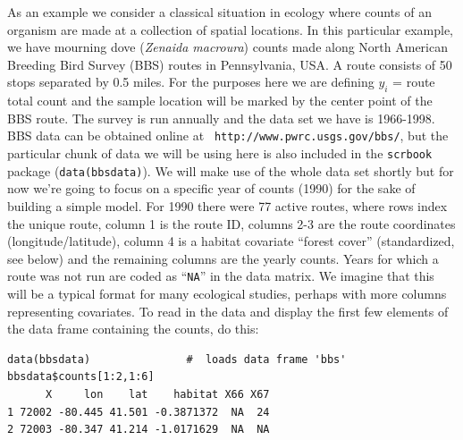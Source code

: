 As an example we consider a classical situation in ecology where
counts of an organism are made at a collection of spatial
locations. In this particular example, we have mourning dove 
({\it Zenaida macroura})
counts
made along North American Breeding Bird Survey (BBS) routes in
Pennsylvania, USA. A route consists of 50 stops separated by 0.5
miles. For the purposes here we are defining $y_i$ = route total count
and the sample location will be marked by the center point of the BBS
route.  The survey is run annually and the data set we have is
1966-1998. BBS data can be obtained online at \mbox{\tt
  http:\//\//www.pwrc.usgs.gov\//bbs\//}, but the particular chunk of
data we will be using here is also included in the {\tt scrbook}
package ({\tt data(bbsdata)}).
We will make use of the whole data set shortly but for now we're going
to focus on a specific year of counts (1990) for the sake of
building a simple model.
 For 1990 there were 77 active routes, where rows index the unique route, column 1 is the
route ID, columns 2-3 are the route coordinates (longitude/latitude),
column 4 is a habitat covariate ``forest cover'' (standardized, see
below) and the remaining columns are the yearly counts. Years for
which a route was not run are coded as ``\mbox{\tt NA}'' in the data matrix. We
imagine that this will be a typical format for many ecological
studies, perhaps with more columns representing covariates.  To read
in the data and display the first few elements of the data frame containing the counts, do
this:
{\small
\begin{verbatim}
data(bbsdata)               #  loads data frame 'bbs'
bbsdata$counts[1:2,1:6]
      X     lon    lat    habitat X66 X67
1 72002 -80.445 41.501 -0.3871372  NA  24
2 72003 -80.347 41.214 -1.0171629  NA  NA
\end{verbatim}
}


